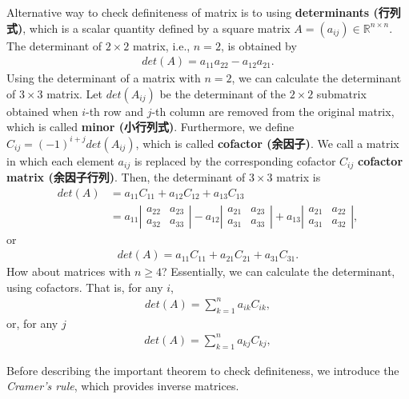 \documentclass[
  12pt,
]{article}
\begin{document}
Alternative way to check definiteness of matrix is to using
\textbf{determinants (行列式)}, which is a scalar quantity defined by a
square matrix \(A = (a_{ij}) \in \mathbb{R}^{n \times n}\). The
determinant of \(2 \times 2\) matrix, i.e., \(n = 2\), is obtained by
\begin{align*}
  det(A) = a_{11}a_{22} - a_{12}a_{21}.
\end{align*} Using the determinant of a matrix with \(n = 2\), we can
calculate the determinant of \(3 \times 3\) matrix. Let \(det(A_{ij})\)
be the determinant of the \(2 \times 2\) submatrix obtained when
\(i\)-th row and \(j\)-th column are removed from the original matrix,
which is called \textbf{minor (小行列式)}. Furthermore, we define
\(C_{ij} = (-1)^{i+j} det(A_{ij})\), which is called \textbf{cofactor
(余因子)}. We call a matrix in which each element \(a_{ij}\) is replaced
by the corresponding cofactor \(C_{ij}\) \textbf{cofactor matrix
(余因子行列)}. Then, the determinant of \(3 \times 3\) matrix is
\begin{align*}
  det(A) 
  &= a_{11} C_{11} + a_{12} C_{12} + a_{13} C_{13}  \\
  &= a_{11} 
  \left| \begin{array}{cc}
    a_{22} & a_{23} \\
    a_{32} & a_{33}
  \end{array} \right| 
  - a_{12}
  \left| \begin{array}{cc}
    a_{21} & a_{23} \\
    a_{31} & a_{33}
  \end{array} \right| 
  + a_{13}
  \left| \begin{array}{cc}
    a_{21} & a_{22} \\
    a_{31} & a_{32}
  \end{array} \right|, 
\end{align*} or \begin{align*}
  det(A) = a_{11} C_{11} + a_{21} C_{21} + a_{31} C_{31}.
\end{align*} How about matrices with \(n \ge 4\)? Essentially, we can
calculate the determinant, using cofactors. That is, for any \(i\),
\begin{align*}
  det(A) = \sum_{k = 1}^n a_{ik} C_{ik},
\end{align*} or, for any \(j\) \begin{align*}
  det(A) = \sum_{k = 1}^n a_{kj} C_{kj},
\end{align*}

Before describing the important theorem to check definiteness, we
introduce the \emph{Cramer's rule}, which provides inverse matrices.
\end{document}
